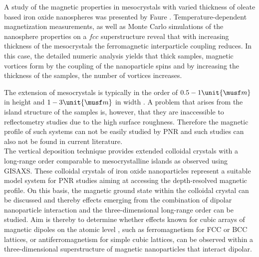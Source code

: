 \documentclass[\main/dresen_thesis.tex]{subfiles}
\begin{document}
  A study of the magnetic properties in mesocrystals with varied thickness of oleate based iron oxide nanospheres was presented by Faure \etal \cite{Faure_2013_2Dto3}.
  Temperature-dependent magnetization measurements, as well as Monte Carlo simulations of the nanosphere properties on a $fcc$ superstructure reveal that with increasing thickness of the mesocrystals the ferromagnetic interparticle coupling reduces.
  In this case, the detailed numeric analysis yields that thick samples, magnetic vortices form by the coupling of the nanoparticle spins and by increasing the thickness of the samples, the number of vortices increases.

  The extension of mesocrystals is typically in the order of $0.5 - 1 \unit{\musf m}$ in height and $1 - 3 \unit{\musf m}$ in width \cite{Wetterskog_2016_Tunin}.
  A problem that arises from the island structure of the samples is, however, that they are inaccessible to reflectometry studies due to the high surface roughness.
  Therefore the magnetic profile of such systems can not be easily studied by PNR and such studies can also not be found in current literature.
  \\

  The vertical deposition technique provides extended colloidal crystals with a long-range order comparable to mesocrystalline islands as observed using GISAXS.
  These colloidal crystals of iron oxide nanoparticles represent a suitable model system for PNR studies aiming at accessing the depth-resolved magnetic profile.
  On this basis, the magnetic ground state within the colloidal crystal can be discussed and thereby effects emerging from the combination of dipolar nanoparticle interaction and the three-dimensional long-range order can be studied.
  Aim is thereby to determine whether effects known for cubic arrays of magnetic dipoles on the atomic level \cite{Luttinger_1946_Theor, Hansen_1998_Model}, such as ferromagnetism for FCC or BCC lattices, or antiferromagnetism for simple cubic lattices, can be observed within a three-dimensional superstructure of magnetic nanoparticles that interact dipolar.
\end{document}
